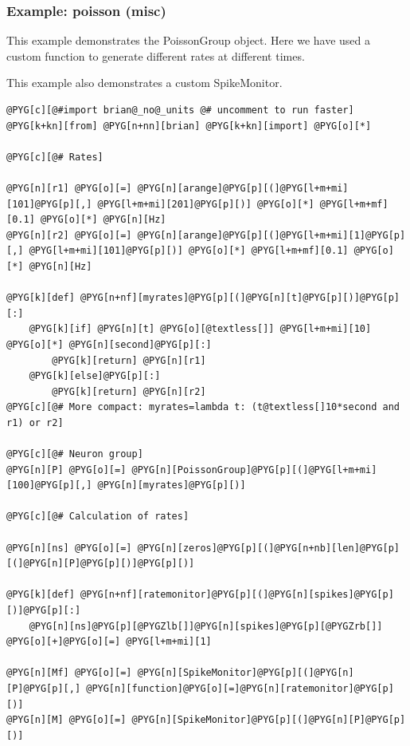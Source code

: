 \documentclass[letterpaper,10pt,english]{manual}
\begin{document}
\resetcurrentobjects
\hypertarget{--doc-examples-misc_poisson}{}

\hypertarget{index-59}{}\subsubsection{Example: poisson (misc)}

This example demonstrates the PoissonGroup object. Here we have
used a custom function to generate different rates at different
times.

This example also demonstrates a custom SpikeMonitor.

\begin{Verbatim}[commandchars=@\[\]]
@PYG[c][@#import brian@_no@_units @# uncomment to run faster]
@PYG[k+kn][from] @PYG[n+nn][brian] @PYG[k+kn][import] @PYG[o][*]

@PYG[c][@# Rates]

@PYG[n][r1] @PYG[o][=] @PYG[n][arange]@PYG[p][(]@PYG[l+m+mi][101]@PYG[p][,] @PYG[l+m+mi][201]@PYG[p][)] @PYG[o][*] @PYG[l+m+mf][0.1] @PYG[o][*] @PYG[n][Hz]
@PYG[n][r2] @PYG[o][=] @PYG[n][arange]@PYG[p][(]@PYG[l+m+mi][1]@PYG[p][,] @PYG[l+m+mi][101]@PYG[p][)] @PYG[o][*] @PYG[l+m+mf][0.1] @PYG[o][*] @PYG[n][Hz]

@PYG[k][def] @PYG[n+nf][myrates]@PYG[p][(]@PYG[n][t]@PYG[p][)]@PYG[p][:]
    @PYG[k][if] @PYG[n][t] @PYG[o][@textless[]] @PYG[l+m+mi][10] @PYG[o][*] @PYG[n][second]@PYG[p][:]
        @PYG[k][return] @PYG[n][r1]
    @PYG[k][else]@PYG[p][:]
        @PYG[k][return] @PYG[n][r2]
@PYG[c][@# More compact: myrates=lambda t: (t@textless[]10*second and r1) or r2]

@PYG[c][@# Neuron group]
@PYG[n][P] @PYG[o][=] @PYG[n][PoissonGroup]@PYG[p][(]@PYG[l+m+mi][100]@PYG[p][,] @PYG[n][myrates]@PYG[p][)]

@PYG[c][@# Calculation of rates]

@PYG[n][ns] @PYG[o][=] @PYG[n][zeros]@PYG[p][(]@PYG[n+nb][len]@PYG[p][(]@PYG[n][P]@PYG[p][)]@PYG[p][)]

@PYG[k][def] @PYG[n+nf][ratemonitor]@PYG[p][(]@PYG[n][spikes]@PYG[p][)]@PYG[p][:]
    @PYG[n][ns]@PYG[p][@PYGZlb[]]@PYG[n][spikes]@PYG[p][@PYGZrb[]] @PYG[o][+]@PYG[o][=] @PYG[l+m+mi][1]

@PYG[n][Mf] @PYG[o][=] @PYG[n][SpikeMonitor]@PYG[p][(]@PYG[n][P]@PYG[p][,] @PYG[n][function]@PYG[o][=]@PYG[n][ratemonitor]@PYG[p][)]
@PYG[n][M] @PYG[o][=] @PYG[n][SpikeMonitor]@PYG[p][(]@PYG[n][P]@PYG[p][)]


\end{Verbatim}
\end{document}
